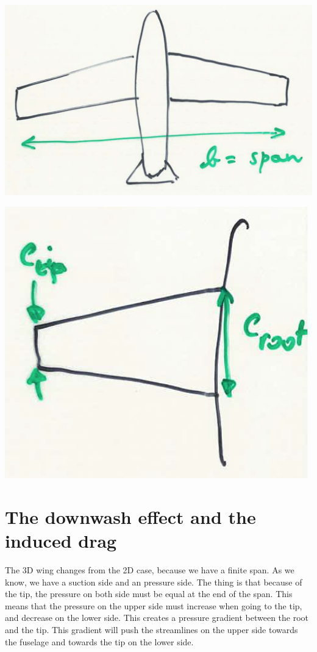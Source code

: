 	\begin{center}
	\begin{minipage}{0.4\textwidth}
	\includegraphics[scale=0.3]{ch3/1}
	\end{minipage}
	\begin{minipage}{0.3\textwidth}
	\includegraphics[scale=0.35]{ch3/2}
	\end{minipage}
	\end{center}
	
\section{The downwash effect and the induced drag}
	The 3D wing changes from the 2D case, because we have a finite span. As we know, we have a suction side and an pressure side. The thing is that because of the tip, the pressure on both side must be equal at the end of the span. This means that the pressure on the upper side must increase when going to the tip, and decrease on the lower side. This creates a pressure gradient between the root and the tip. This gradient will push the streamlines on the upper side towards the fuselage and towards the tip on the lower side. 
	
